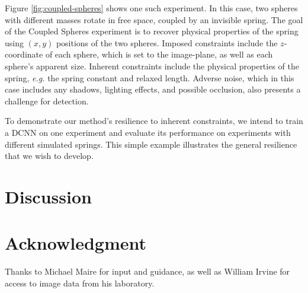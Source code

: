 \documentclass[10pt, journal]{IEEEtran}
\begin{document}
Figure \ref{fig:coupled-spheres} shows one such experiment. In this case, two
spheres with different masses rotate in free space, coupled by an invisible
spring. The goal of the Coupled Spheres experiment is to recover physical
properties of the spring using $(x,y)$ positions of the two spheres. Imposed
constraints include the $z$-coordinate of each sphere, which is set to the
image-plane, as well as each sphere's apparent size. Inherent constraints
include the physical properties of the spring, \textit{e.g.} the spring constant
and relaxed length. Adverse noise, which in this case includes any shadows,
lighting effects, and possible occlusion, also presents a challenge for
detection.

To demonstrate our method's resilience to inherent constraints, we intend to
train a DCNN on one experiment and evaluate its performance on experiments with
different simulated springs. This simple example illustrates the general
resilience that we wish to develop.

\section{Discussion}
\label{sec:discussion}




\section*{Acknowledgment}
\label{sec:acknowledgment}

Thanks to Michael Maire for input and guidance, as well as William Irvine for
access to image data from his laboratory.



\end{document}
